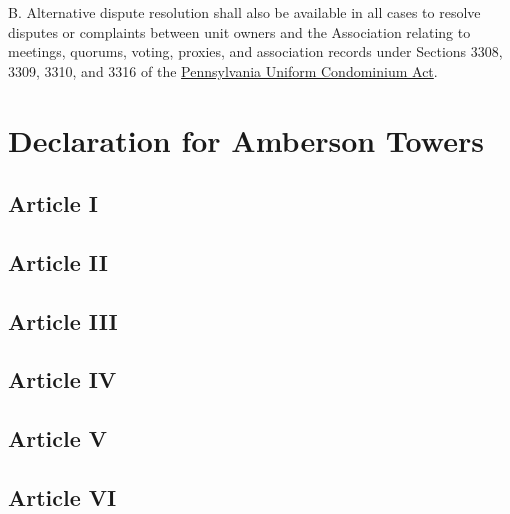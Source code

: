 \documentclass[
]{book}
\begin{document}
B. Alternative dispute resolution shall also be available in all cases to resolve disputes or complaints between unit owners and the Association relating to meetings, quorums, voting, proxies, and association records under Sections 3308, 3309, 3310, and 3316 of the \href{https://www.ncsl.org/documents/environ/PAcondo.pdf}{Pennsylvania Uniform Condominium Act}.

\hypertarget{declaration-for-amberson-towers}{%
\chapter{Declaration for Amberson Towers}\label{declaration-for-amberson-towers}}

\hypertarget{article-i}{%
\section*{Article I}\label{article-i}}

\hypertarget{article-ii}{%
\section*{Article II}\label{article-ii}}

\hypertarget{article-iii}{%
\section*{Article III}\label{article-iii}}

\hypertarget{article-iv}{%
\section*{Article IV}\label{article-iv}}

\hypertarget{article-v}{%
\section*{Article V}\label{article-v}}

\hypertarget{article-vi}{%
\section*{Article VI}\label{article-vi}}
\end{document}
